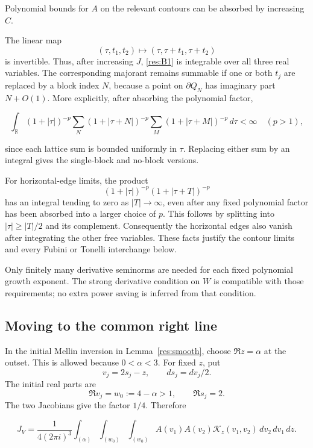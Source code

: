 \documentclass[11pt]{article}
\numberwithin{equation}{section}
\begin{document}
Polynomial bounds for \(A\) on the relevant contours can be absorbed by
increasing \(C\).

The linear map \[
 (\tau,t_1,t_2)\longmapsto(\tau,\tau+t_1,\tau+t_2)
\] is invertible. Thus, after increasing \(J\), \eqref{res:B1} is
integrable over all three real variables. The corresponding majorant
remains summable if one or both \(t_j\) are replaced by a block index
\(N\), because a point on \(\partial Q_N\) has imaginary part
\(N+O(1)\). More explicitly, after absorbing the polynomial factor,

\begin{equation}\label{res:B2}
\int_{\mathbb R}(1+|\tau|)^{-p}
 \sum_N(1+|\tau+N|)^{-p}
 \sum_M(1+|\tau+M|)^{-p}\,d\tau<\infty
 \quad(p>1),
\end{equation}

since each lattice sum is bounded uniformly in \(\tau\). Replacing
either sum by an integral gives the single-block and no-block versions.

For horizontal-edge limits, the product \[
 (1+|\tau|)^{-p}(1+|\tau+T|)^{-p}
\] has an integral tending to zero as \(|T|\to\infty\), even after any
fixed polynomial factor has been absorbed into a larger choice of \(p\).
This follows by splitting into \(|\tau|\geq |T|/2\) and its complement.
Consequently the horizontal edges also vanish after integrating the
other free variables. These facts justify the contour limits and every
Fubini or Tonelli interchange below.

Only finitely many derivative seminorms are needed for each fixed
polynomial growth exponent. The strong derivative condition on \(W\) is
compatible with those requirements; no extra power saving is inferred
from that condition.

\subsection{Moving to the common right
line}\label{moving-to-the-common-right-line}

In the initial Mellin inversion in
Lemma~\ref{res:smooth}, choose \(\Re z=\alpha\) at the
outset. This is allowed because \(0<\alpha<3\). For fixed \(z\), put \[
 v_j=2s_j-z,\qquad ds_j=dv_j/2.
\] The initial real parts are \[
 \Re v_j=w_0:=4-\alpha>1,\qquad \Re s_j=2.
\] The two Jacobians give the factor \(1/4\). Therefore

\begin{equation}\label{res:B3}
J_V=\frac1{4(2\pi i)^3}
 \int_{(\alpha)}\int_{(w_0)}\int_{(w_0)}
 A(v_1)A(v_2)\mathcal K_z(v_1,v_2)\,dv_2\,dv_1\,dz.
\end{equation}
\end{document}
